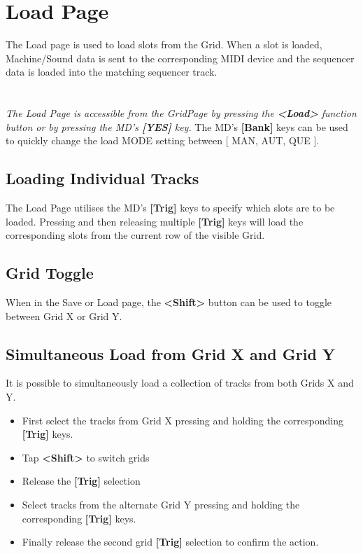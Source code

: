 \chapter{Load Page}
The Load page is used to load slots from the Grid. When a slot is loaded, Machine/Sound data is sent to the corresponding MIDI device and the sequencer data is loaded into the matching sequencer track.\\
\\
\\
\textit{The Load Page is accessible from the GridPage by pressing the  \textbf{<Load>} function button or by pressing the MD's \textbf{[YES]} key.}
The MD's \textbf{[Bank]} keys can be used to quickly change the load MODE setting between [ MAN, AUT, QUE ].
\newpage
\section{Loading Individual Tracks}
The Load Page utilises the MD's \textbf{[Trig]} keys to specify which slots are to be loaded. Pressing and then releasing multiple \textbf{[Trig]} keys will load the corresponding slots from the current row of the visible Grid.
\section{Grid Toggle}
When in the Save or Load page, the \textbf{<Shift>} button can be used to toggle between Grid X or Grid Y.
\section{Simultaneous Load from Grid X and Grid Y}
It is possible to simultaneously load a collection of tracks from both Grids X and Y. 
\begin{itemize}
\item First select the tracks from Grid X pressing and holding the corresponding \textbf{[Trig]} keys.
\item Tap \textbf{<Shift>} to switch grids
\item Release the \textbf{[Trig]} selection
\item Select tracks from the alternate Grid Y pressing and holding the corresponding \textbf{[Trig]} keys. 
\item Finally release the second grid \textbf{[Trig]} selection to confirm the action. 
\end{itemize}

